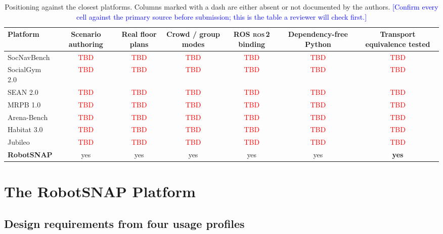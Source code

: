 \documentclass[pdflatex,sn-mathphys-num]{template/sn-jnl}%
\newcommand{\tbd}[1][TBD]{\textcolor{red}{#1}}
\newcommand{\note}[1]{\textcolor{blue}{\footnotesize[#1]}}
\newcommand{\ros}{\textsc{ros}\,2}
\begin{document}
\begin{table}[t]
  \centering
  \caption{Positioning against the closest platforms. Columns marked with a
  dash are either absent or not documented by the authors.
  \note{Confirm every cell against the primary source before submission; this
  is the table a reviewer will check first.}}
  \label{tab:positioning}
  \begin{tabular}{lcccccc}
    \toprule
    Platform & Scenario authoring & Real floor plans & Crowd / group modes
      & ROS \ros{} binding & Dependency-free Python & Transport equivalence tested \\
    \midrule
    SocNavBench        & \tbd & \tbd & \tbd & \tbd & \tbd & \tbd \\
    SocialGym 2.0      & \tbd & \tbd & \tbd & \tbd & \tbd & \tbd \\
    SEAN 2.0           & \tbd & \tbd & \tbd & \tbd & \tbd & \tbd \\
    MRPB 1.0           & \tbd & \tbd & \tbd & \tbd & \tbd & \tbd \\
    Arena-Bench        & \tbd & \tbd & \tbd & \tbd & \tbd & \tbd \\
    Habitat 3.0        & \tbd & \tbd & \tbd & \tbd & \tbd & \tbd \\
    Jubileo            & \tbd & \tbd & \tbd & \tbd & \tbd & \tbd \\
    \midrule
    \textbf{RobotSNAP} & yes & yes & yes & yes & yes & \textbf{yes} \\
    \bottomrule
  \end{tabular}
\end{table}

\section{The RobotSNAP Platform}
\label{sec:platform}

\subsection{Design requirements from four usage profiles}
\label{sec:platform:requirements}
\end{document}
